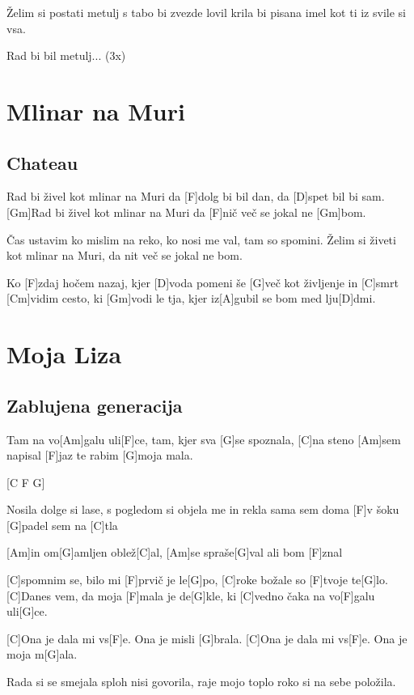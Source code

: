 \documentclass[a4paper,12pt]{article}
\begin{document}
\begin{multicols}{2}
\begin{guitar}
Želim si
postati metulj
s tabo bi zvezde lovil
krila bi pisana imel
kot ti iz svile si vsa.


Rad bi bil metulj... (3x)

\end{guitar}
\section{Mlinar na Muri}
\subsection*{Chateau}
\begin{guitar}
[Gm]Rad bi živel kot mlinar na Muri
da [F]dolg bi bil dan, da [D]spet bil bi sam.
[Gm]Rad bi živel kot mlinar na Muri
da [F]nič več se jokal ne [Gm]bom.

Čas ustavim ko mislim na reko,
ko nosi me val, tam so spomini.
Želim si živeti kot mlinar na Muri,
da nit več se jokal ne bom.


Ko [F]zdaj hočem nazaj, kjer [D]voda pomeni
še [G]več kot življenje in [C]smrt
[Cm]vidim cesto, ki [Gm]vodi le tja,
kjer iz[A]gubil se bom med lju[D]dmi.

\end{guitar}
\section{Moja Liza}
\subsection*{Zablujena generacija}
\begin{guitar}
[C]Tam na vo[Am]galu uli[F]ce,
tam, kjer sva [G]se spoznala,
[C]na steno [Am]sem napisal
[F]jaz te rabim [G]moja mala.

[C F G]

Nosila dolge si lase,
s pogledom si objela me
in rekla sama sem doma
[F]v šoku [G]padel sem na [C]tla


[Am]in om[G]amljen oblež[C]al,
[Am]se spraše[G]val ali bom [F]znal


[C]spomnim se, bilo mi [F]prvič je le[G]po,
[C]roke božale so [F]tvoje te[G]lo.
[C]Danes vem, da moja [F]mala je de[G]kle,
ki [C]vedno čaka na vo[F]galu uli[G]ce.


[C]Ona je dala mi vs[F]e.
Ona je misli [G]brala.
[C]Ona je dala mi vs[F]e.
Ona je moja m[G]ala.


Rada si se smejala
sploh nisi govorila,
raje mojo toplo roko
si na sebe položila.



\end{guitar}
\end{multicols}
\end{document}

